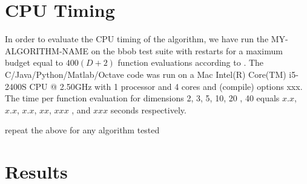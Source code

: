 \documentclass[sigconf]{acmart}
\newcommand{\change}[1]{{\color{red} #1}}
\begin{document}




\maketitle


%
%
%
\section{CPU Timing}
In order to evaluate the CPU timing of the algorithm, we have run the \change{MY-ALGORITHM-NAME} on the  \change{bbob test suite \cite{hansen2010fun}} with restarts for a maximum budget equal to \change{$400 (D + 2)$} function evaluations according to \cite{hansen2016exp}. The \change{C/Java/Python/Matlab/Octave} code was run on a \change{Mac Intel(R) Core(TM) i5-2400S CPU @ 2.50GHz} with \change{1} processor and \change{4} cores \change{and (compile) options xxx}. The time per function evaluation for dimensions 2, 3, 5, 10, 20\change{, 40} equals \change{$x.x$}, \change{$x.x$}, \change{$x.x$}, \change{$xx$}, \change{$xxx$}\change{, and $xxx$} seconds respectively. 


\change{repeat the above for any algorithm tested}


\section{Results}
\end{document}
